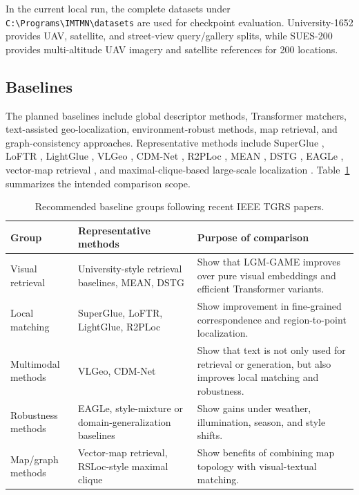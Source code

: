 \documentclass[journal]{IEEEtran}
\begin{document}
In the current local run, the complete datasets under \texttt{C:\textbackslash Programs\textbackslash IMTMN\textbackslash datasets} are used for checkpoint evaluation. University-1652 provides UAV, satellite, and street-view query/gallery splits, while SUES-200 provides multi-altitude UAV imagery and satellite references for 200 locations.

\subsection{Baselines}
The planned baselines include global descriptor methods, Transformer matchers, text-assisted geo-localization, environment-robust methods, map retrieval, and graph-consistency approaches. Representative methods include SuperGlue \cite{superglue2020}, LoFTR \cite{loftr2021}, LightGlue \cite{lightglue2023}, VLGeo \cite{vlgeo2026}, CDM-Net \cite{cdmnet2025}, R2PLoc \cite{r2ploc2025}, MEAN \cite{mean2025}, DSTG \cite{dstg2025}, EAGLe \cite{eagle2025}, vector-map retrieval \cite{vectormap2025}, and maximal-clique-based large-scale localization \cite{rsloc820k2025}. Table~\ref{tab:baseline_groups} summarizes the intended comparison scope.

\begin{table}[t]
\centering
\caption{Recommended baseline groups following recent IEEE TGRS papers.}
\label{tab:baseline_groups}
\begin{tabular}{p{}p{}p{}}
\toprule
Group & Representative methods & Purpose of comparison \\
\midrule
Visual retrieval & University-style retrieval baselines, MEAN, DSTG & Show that LGM-GAME improves over pure visual embeddings and efficient Transformer variants. \\
Local matching & SuperGlue, LoFTR, LightGlue, R2PLoc & Show improvement in fine-grained correspondence and region-to-point localization. \\
Multimodal methods & VLGeo, CDM-Net & Show that text is not only used for retrieval or generation, but also improves local matching and robustness. \\
Robustness methods & EAGLe, style-mixture or domain-generalization baselines & Show gains under weather, illumination, season, and style shifts. \\
Map/graph methods & Vector-map retrieval, RSLoc-style maximal clique & Show benefits of combining map topology with visual-textual matching. \\
\bottomrule
\end{tabular}
\end{table}
\end{document}
